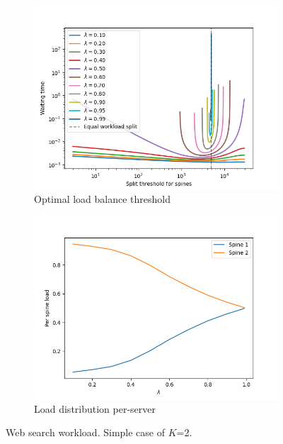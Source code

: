 \begin{figure}
	\centering
	\begin{subfigure}{.5\textwidth}
		\centering
		\includegraphics[width=.99\linewidth]{Chapter3/Figures/equal_workload_split_bpws}
		\caption{Optimal load balance threshold}
		\label{fig:cost-ws}
	\end{subfigure}%
	\begin{subfigure}{.5\textwidth}
		\centering
		\includegraphics[width=.99\linewidth]{Chapter3/Figures/per_spine_load_bpdm}%
		\caption{Load distribution per-server }
		\label{fig:perspineload-ws}
	\end{subfigure}
	\caption{Web search workload. Simple case of $K$=2.}
	\label{fig:lbthreshold-ws}
\end{figure}
